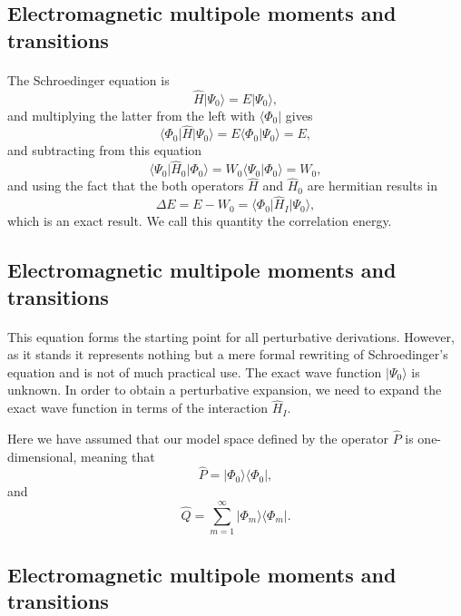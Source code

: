 \documentclass[%
twoside,                 %
final,                   %
10pt]{article}
\begin{document}
\subsection*{Electromagnetic multipole moments and transitions}

\paragraph{}
The Schroedinger equation is
\[
\hat{H}\vert \Psi_0\rangle = E\vert \Psi_0\rangle,
\]
and multiplying the latter from the left with $\langle \Phi_0\vert $ gives
\[
\langle \Phi_0\vert \hat{H}\vert \Psi_0\rangle = E\langle \Phi_0\vert \Psi_0\rangle=E,
\]
and subtracting from this equation
\[
\langle \Psi_0\vert \hat{H}_0\vert \Phi_0\rangle= W_0\langle \Psi_0\vert \Phi_0\rangle=W_0,
\]
and using the fact that the both operators $\hat{H}$ and $\hat{H}_0$ are hermitian 
results in
\[
\Delta E=E-W_0=\langle \Phi_0\vert \hat{H}_I\vert \Psi_0\rangle,
\]
which is an exact result. We call this quantity the correlation energy.



\subsection*{Electromagnetic multipole moments and transitions}

\paragraph{}
This equation forms the starting point for all perturbative derivations. However,
as it stands it represents nothing but a mere formal rewriting of Schroedinger's equation and is not of much practical use. The exact wave function $\vert \Psi_0\rangle$ is unknown. In order to obtain a perturbative expansion, we need to expand the exact wave function in terms of the interaction $\hat{H}_I$. 

Here we have assumed that our model space defined by the operator $\hat{P}$ is one-dimensional, meaning that
\[
\hat{P}= \vert \Phi_0\rangle \langle \Phi_0\vert ,
\]
and
\[
\hat{Q}=\sum_{m=1}^{\infty}\vert \Phi_m\rangle \langle \Phi_m\vert .
\]



\subsection*{Electromagnetic multipole moments and transitions}
\end{document}
